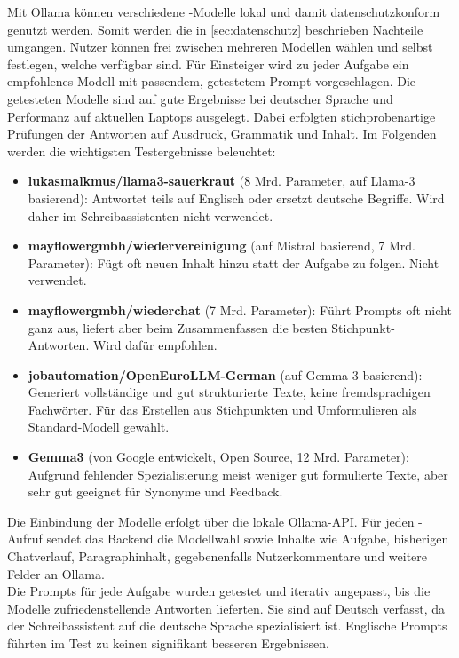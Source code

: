 \documentclass[../main.tex]{subfiles}
\begin{document}
Mit Ollama können verschiedene -Modelle lokal und damit datenschutzkonform genutzt werden. Somit werden die in \autoref{sec:datenschutz} beschrieben Nachteile umgangen. 
Nutzer können frei zwischen mehreren Modellen wählen und selbst festlegen, welche verfügbar sind. Für Einsteiger wird zu jeder Aufgabe ein empfohlenes Modell mit passendem, 
getestetem Prompt vorgeschlagen. Die getesteten Modelle sind auf gute Ergebnisse bei deutscher Sprache und Performanz auf aktuellen Laptops ausgelegt. Dabei erfolgten stichprobenartige 
Prüfungen der Antworten auf Ausdruck, Grammatik und Inhalt. Im Folgenden werden die wichtigsten Testergebnisse beleuchtet:

\begin{itemize} \item \textbf{lukasmalkmus/llama3-sauerkraut} (8 Mrd. Parameter, auf Llama-3 basierend)\cite{sauerkraut}: Antwortet teils auf Englisch oder ersetzt deutsche Begriffe. Wird daher im Schreibassistenten nicht verwendet.

\item \textbf{mayflowergmbh/wiedervereinigung} (auf Mistral basierend, 7 Mrd. Parameter)\cite{wiedervereinigung}: Fügt oft neuen Inhalt hinzu statt der Aufgabe zu folgen. Nicht verwendet.

\item \textbf{mayflowergmbh/wiederchat} (7 Mrd. Parameter)\cite{wiederchat}: Führt Prompts oft nicht ganz aus, liefert aber beim Zusammenfassen die besten Stichpunkt-Antworten. Wird dafür empfohlen.

\item \textbf{jobautomation/OpenEuroLLM-German} (auf Gemma 3 basierend)\cite{openeurollm}: Generiert vollständige und gut strukturierte Texte, keine fremdsprachigen Fachwörter. Für das Erstellen aus Stichpunkten und Umformulieren als Standard-Modell gewählt.

\item \textbf{Gemma3} (von Google entwickelt, Open Source, 12 Mrd. Parameter)\cite{gemma3}: Aufgrund fehlender Spezialisierung meist weniger gut formulierte Texte, aber sehr gut geeignet für Synonyme und Feedback. \end{itemize}

Die Einbindung der Modelle erfolgt über die lokale Ollama-API. Für jeden -Aufruf sendet das Backend die Modellwahl sowie Inhalte wie Aufgabe, bisherigen Chatverlauf, 
Paragraphinhalt, gegebenenfalls Nutzerkommentare und weitere Felder an Ollama.\\ Die Prompts für jede Aufgabe wurden getestet und iterativ angepasst, bis die Modelle zufriedenstellende Antworten 
lieferten. Sie sind auf Deutsch verfasst, da der Schreibassistent auf die deutsche Sprache spezialisiert ist. Englische Prompts führten im Test zu keinen signifikant besseren Ergebnissen.
\end{document}

